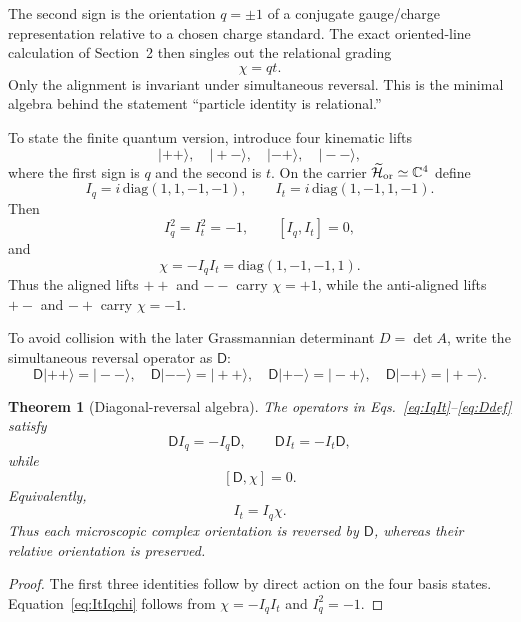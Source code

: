 \documentclass[11pt]{article}
\newtheorem{theorem}{Theorem}[section]
\theoremstyle{definition}\newtheorem{definition}[theorem]{Definition}
\theoremstyle{remark}\newtheorem{remark}[theorem]{Remark}\newtheorem{conjecture}[theorem]{Conjecture}
\begin{document}
The second sign is the orientation $q=\pm1$ of a conjugate gauge/charge representation relative to a chosen charge standard. The exact oriented-line calculation of Section~2 then singles out the relational grading
\begin{equation}\label{eq:chiqt4}
 \boxed{\chi=qt.}
\end{equation}
Only the alignment is invariant under simultaneous reversal. This is the minimal algebra behind the statement ``particle identity is relational.''

To state the finite quantum version, introduce four kinematic lifts
\begin{equation}\label{eq:fourlifts}
 |++\rangle,\quad |+-\rangle,\quad |-+\rangle,\quad |--\rangle,
\end{equation}
where the first sign is $q$ and the second is $t$. On the carrier $\widetilde{\mathcal H}_{\rm or}\simeq\mathbb C^4$ define
\begin{equation}\label{eq:IqIt}
 I_q=i\,\mathrm{diag}(1,1,-1,-1),\qquad
 I_t=i\,\mathrm{diag}(1,-1,1,-1).
\end{equation}
Then
\begin{equation}
 I_q^2=I_t^2=-1,\qquad [I_q,I_t]=0,
\end{equation}
and
\begin{equation}\label{eq:chiIqIt}
 \boxed{\chi=-I_qI_t=\mathrm{diag}(1,-1,-1,1)}.
\end{equation}
Thus the aligned lifts $++$ and $--$ carry $\chi=+1$, while the anti-aligned lifts $+-$ and $-+$ carry $\chi=-1$.

To avoid collision with the later Grassmannian determinant $D=\det A$, write the simultaneous reversal operator as $\mathsf D$:
\begin{equation}\label{eq:Ddef}
 \mathsf D|++\rangle=|--\rangle,\quad \mathsf D|--\rangle=|++\rangle,\quad
 \mathsf D|+-\rangle=|-+\rangle,\quad \mathsf D|-+\rangle=|+-\rangle.
\end{equation}

\begin{theorem}[Diagonal-reversal algebra]\label{thm:diagonalcover}
The operators in Eqs.~\eqref{eq:IqIt}--\eqref{eq:Ddef} satisfy
\begin{equation}\label{eq:Danti}
 \mathsf D I_q=-I_q\mathsf D,\qquad
 \mathsf D I_t=-I_t\mathsf D,
\end{equation}
while
\begin{equation}\label{eq:Dchi}
 [\mathsf D,\chi]=0.
\end{equation}
Equivalently,
\begin{equation}\label{eq:ItIqchi}
 \boxed{I_t=I_q\chi.}
\end{equation}
Thus each microscopic complex orientation is reversed by $\mathsf D$, whereas their relative orientation is preserved.
\end{theorem}
\begin{proof}
The first three identities follow by direct action on the four basis states. Equation~\eqref{eq:ItIqchi} follows from $\chi=-I_qI_t$ and $I_q^2=-1$.
\end{proof}
\end{document}
